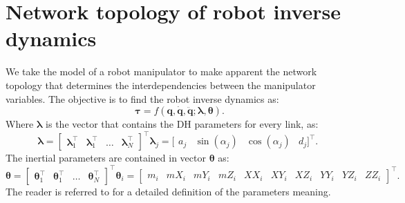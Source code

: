 \section{Network topology of robot inverse dynamics}\label{sec:case_study}
We take the model of a robot manipulator to make apparent the network topology that determines the interdependencies between the manipulator variables. The objective is to find the robot inverse dynamics as:
\begin{equation}
\bm{\tau} = f(\bm{q},\dot{\bm{q}},\ddot{\bm{q}};\bm{\lambda},\bm{\theta}).
\label{eq:inverse_dynamics}
\end{equation}
Where $\bm{\lambda}$ is the vector that contains the DH parameters for every link, as:
\begin{subequations}
\begin{equation}
\bm{\lambda}=\begin{bmatrix}
\bm{\lambda}_1^\intercal & \bm{\lambda}_1^\intercal & \ldots & \bm{\lambda}_N^\intercal
\end{bmatrix}^\intercal
\end{equation}
\begin{equation}
\bm{\lambda}_j=[\begin{matrix}
a_j& \sin(\alpha_j) & \cos(\alpha_j) & d_j]^\intercal.
\end{matrix}
\label{eq:kin_training_par}
\end{equation}
\end{subequations} 
The inertial parameters are contained in vector $\bm{\theta}$ as:
\begin{subequations}
\begin{equation}
\bm{\theta}=\begin{bmatrix}
\bm{\theta}_1^\intercal & \bm{\theta}_1^\intercal & \ldots & \bm{\theta}_N^\intercal
\end{bmatrix}^\intercal
\end{equation}
\begin{equation}
\bm{\theta}_i=
[\begin{smallmatrix}
m_i & mX_i & mY_i & mZ_i & XX_i & XY_i & XZ_i & YY_i & YZ_i & ZZ_i
\end{smallmatrix}]^\intercal.
\label{eq:dyn_training_par}
\end{equation}
\end{subequations} 
The reader is referred to \cite{AnAtkHol1985} for a detailed definition of the parameters meaning.
